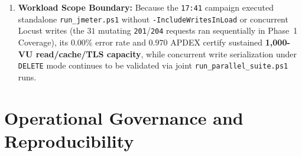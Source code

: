 \documentclass[11pt,letterpaper]{article}
\begin{document}
\begin{enumerate}
\begin{itemize}
    \item Warm keep-alive requests (\texttt{Connect = 0}, $n = 7{,}574$) averaged $257.93\text{ ms}$ ($p_{50} = 97\text{ ms}$, $p_{95} = 895\text{ ms}$). New TLS handshakes (\texttt{Connect > 0}, $n = 1{,}000$) averaged $460.23\text{ ms}$ ($p_{50} = 228\text{ ms}$, $p_{95} = 1548\text{ ms}$), driven by TCP/TLS setup jumping to $\bar{C} = 272.7\text{ ms}$ ($p_{95} = 1{,}126\text{ ms}$, $\max = 9{,}831\text{ ms}$) compared to $140.9\text{--}146.3\text{ ms}$ mean across Tiers~1--4.
    \item Second-by-second slicing pinpoints a transient 9-second window (\texttt{t+206s..t+214s}, i.e.\ $+24\text{--}32\text{ s}$ into Tier~5 as the final ramp cohort pushed active throughput to $252\text{--}284\text{ req/s}$) absorbing the transient $p_{50} = 318\text{--}590\text{ ms}$ / $p_{95} = 1{,}165\text{--}3{,}299\text{ ms}$ queue. Tellingly, even static \texttt{GET /images/engineer.png} (bypassing Node and SQLite via Nginx \texttt{try\_files}) hit $\max = 11{,}986\text{ ms}$ in that exact \texttt{t+208s} window. From \texttt{t+216s} through \texttt{t+225s} at full $1{,}000$-VU concurrency ($248\text{--}312\text{ req/s}$), latency recovered cleanly ($p_{50} = 85\text{--}155\text{ ms}$ except one $233\text{ ms}$ tick; $p_{95} = 261\text{--}679\text{ ms}$; $0$ errors).
  \end{itemize}
  \item \textbf{Workload Scope Boundary:} Because the \texttt{17:41} campaign executed standalone \texttt{run\_jmeter.ps1} without \texttt{-IncludeWritesInLoad} or concurrent Locust writes (the $31$ mutating \texttt{201}/\texttt{204} requests ran sequentially in Phase~1 Coverage), its $0.00\%$ error rate and $0.970$ APDEX certify sustained \textbf{1,000-VU read/cache/TLS capacity}, while concurrent write serialization under \texttt{DELETE} mode continues to be validated via joint \texttt{run\_parallel\_suite.ps1} runs.
\end{enumerate}

\section{Operational Governance and Reproducibility}
\end{document}
